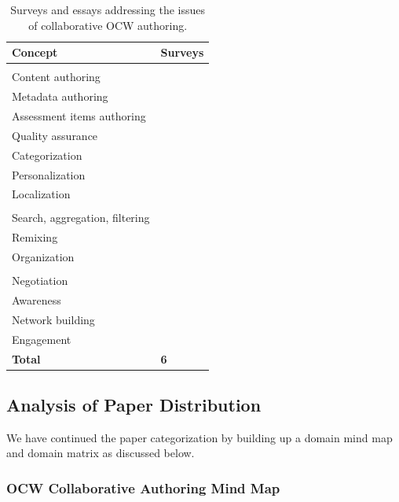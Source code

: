 \documentclass[PhD, Submit, ngerman,UKenglish,table]{scrbook}
\begin{document}
\begin{table}[!ht]
{\centering
\begin{tabulary}{0.40\textwidth}{l|l}
\toprule
\textbf{Concept} & \textbf{Surveys} \\
\midrule
{}
\\
Content authoring & \\
Metadata authoring & \cite{Ola2009} \\
Assessment items authoring & \\
Quality assurance & \\
Categorization & \\
Personalization & \cite{Brusilovsky2003, Chiribuca2008, Lee2010}\\
Localization & \\
\\
Search, aggregation, filtering  & \\
Remixing & \\
Organization & \\
\\
Negotiation & \cite{Johnson200145}\\
Awareness & \cite{Johnson200145}\\
Network building & \cite{Johnson200145, blau2013collaboration}\\
Engagement & \cite{Johnson200145, blau2013collaboration}\\
\midrule

\textbf{Total} & \textbf{6}\\
\bottomrule

\end{tabulary}
\caption{Surveys and essays addressing the issues of collaborative OCW authoring.}
\label{tab:survey_2}
}

\end{table}

\subsection{Analysis of Paper Distribution}

We have continued the paper categorization by building up a domain mind map and domain matrix as discussed below.

\subsubsection{OCW Collaborative Authoring Mind Map}
\label{sec:mind_map}
\end{document}
